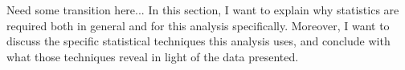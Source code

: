     Need some transition here...
    In this section, I want to explain why statistics are required
        both in general and for this analysis specifically.
    Moreover, I want to discuss the specific statistical techniques this analysis uses,
        and conclude with what those techniques reveal in light of the data presented.



